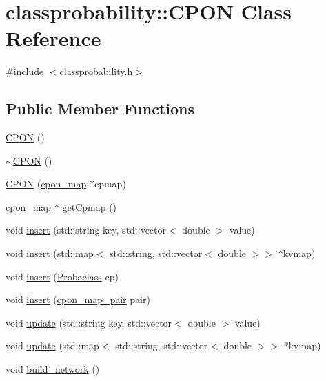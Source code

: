 \hypertarget{classclassprobability_1_1_c_p_o_n}{}\section{classprobability\+:\+:C\+P\+ON Class Reference}
\label{classclassprobability_1_1_c_p_o_n}


{\ttfamily \#include $<$classprobability.\+h$>$}

\subsection*{Public Member Functions}
\begin{DoxyCompactItemize}
\item 
\hyperlink{classclassprobability_1_1_c_p_o_n_a601ad865675106d4a8b307a17aec4c23}{C\+P\+ON} ()
\item 
\hyperlink{classclassprobability_1_1_c_p_o_n_ade30348622c337e028f3aed5bbaacd37}{$\sim$\+C\+P\+ON} ()
\item 
\hyperlink{classclassprobability_1_1_c_p_o_n_ac012705da1b133b2a3d82630d532180f}{C\+P\+ON} (\hyperlink{namespaceclassprobability_a9b76324c0524b1c0c9d52954f83ad037}{cpon\+\_\+map} $\ast$cpmap)
\item 
\hyperlink{namespaceclassprobability_a9b76324c0524b1c0c9d52954f83ad037}{cpon\+\_\+map} $\ast$ \hyperlink{classclassprobability_1_1_c_p_o_n_ac98ec4140046f9b6b4169617c63855f7}{get\+Cpmap} ()
\item 
void \hyperlink{classclassprobability_1_1_c_p_o_n_a818ff197e0e111a9f72931c47fd29e23}{insert} (std\+::string key, std\+::vector$<$ double $>$ value)
\item 
void \hyperlink{classclassprobability_1_1_c_p_o_n_a7eeda7fbd7619106e069937f51330541}{insert} (std\+::map$<$ std\+::string, std\+::vector$<$ double $>$$>$ $\ast$kvmap)
\item 
void \hyperlink{classclassprobability_1_1_c_p_o_n_a127a7d9e09a4ed3e0905a638c244e84e}{insert} (\hyperlink{classclassprobability_1_1_probaclass}{Probaclass} cp)
\item 
void \hyperlink{classclassprobability_1_1_c_p_o_n_a55a08788a294e49bd3f11c8d2493f474}{insert} (\hyperlink{namespaceclassprobability_af9fe3e67e0088680cf2535772e5f5139}{cpon\+\_\+map\+\_\+pair} pair)
\item 
void \hyperlink{classclassprobability_1_1_c_p_o_n_a71785e865d4e82e5193888dc0d31ee5c}{update} (std\+::string key, std\+::vector$<$ double $>$ value)
\item 
void \hyperlink{classclassprobability_1_1_c_p_o_n_af388fec40ceb8832c9c6ef8b5df006f0}{update} (std\+::map$<$ std\+::string, std\+::vector$<$ double $>$$>$ $\ast$kvmap)
\item 
void \hyperlink{classclassprobability_1_1_c_p_o_n_a4d240acccf8436e2ce784368aff1e062}{build\+\_\+network} ()
\end{DoxyCompactItemize}


